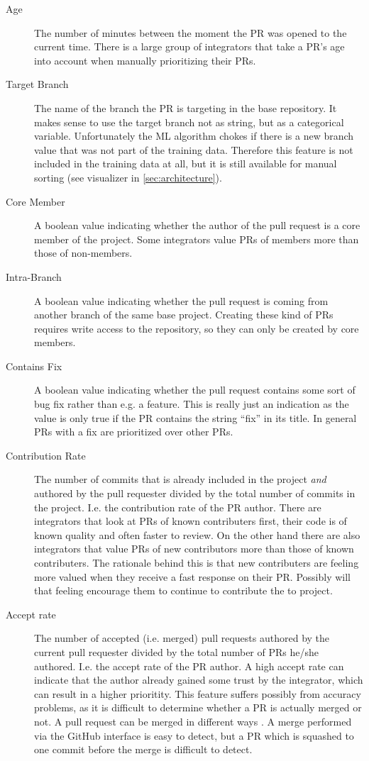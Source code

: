 \begin{description}
\item[Age]
The number of minutes between the moment the PR was opened to the current time.
There is a large group of integrators that take a PR's age into account when manually prioritizing their PRs.

\item[Target Branch]
The name of the branch the PR is targeting in the base repository.
It makes sense to use the target branch not as string, but as a categorical variable.
Unfortunately the ML algorithm chokes if there is a new branch value that was not part of the training data.
Therefore this feature is not included in the training data at all, but it is still available for manual sorting (see visualizer in \ref{sec:architecture}).

\item[Core Member]
A boolean value indicating whether the author of the pull request is a core member of the project.
Some integrators value PRs of members more than those of non-members.

\item[Intra-Branch]
A boolean value indicating whether the pull request is coming from another branch of the same base project.
Creating these kind of PRs requires write access to the repository, so they can only be created by core members.

\item[Contains Fix]
A boolean value indicating whether the pull request contains some sort of bug fix rather than e.g. a feature.
This is really just an indication as the value is only true if the PR contains the string ``fix'' in its title.
In general PRs with a fix are prioritized over other PRs.

\item[Contribution Rate]
The number of commits that is already included in the project \emph{and} authored by the pull requester divided by the total number of commits in the project.
I.e. the contribution rate of the PR author.
There are integrators that look at PRs of known contributers first, their code is of known quality and often faster to review.
On the other hand there are also integrators that value PRs of new contributors more than those of known contributers.
The rationale behind this is that new contributers are feeling more valued when they receive a fast response on their PR.
Possibly will that feeling encourage them to continue to contribute the to project.

\item[Accept rate]
The number of accepted (i.e. merged) pull requests authored by the current pull requester divided by the total number of PRs he/she authored.
I.e. the accept rate of the PR author.
A high accept rate can indicate that the author already gained some trust by the integrator, which can result in a higher prioritity.
This feature suffers possibly from accuracy problems, as it is difficult to determine whether a PR is actually merged or not.
A pull request can be merged in different ways \cite{GPD14}.
A merge performed via the GitHub interface is easy to detect, but a PR which is squashed to one commit before the merge is difficult to detect.


\end{description}
